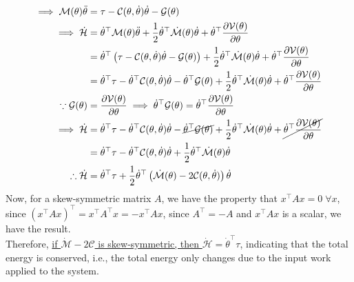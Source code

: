\begin{align*}
    \implies
    \mathcal{M}(\theta) \ddot{\theta}
     & =
    \tau
    -
    \mathcal{C}(\theta, \dot{\theta}) \dot{\theta}
    -
    \mathcal{G}(\theta)
    \\
    \implies
    \dot{\mathcal{H}}
     & =
    \dot{\theta}^{\top} \mathcal{M}(\theta) \ddot{\theta}
    +
    \frac{1}{2}
    \dot{\theta}^{\top} \dot{\mathcal{M}}(\theta) \dot{\theta}
    +
    \dot{\theta}^{\top} \frac{\partial \mathcal{V}(\theta)}{\partial \theta}
    \\
     & =
    \dot{\theta}^{\top} \left( \tau - \mathcal{C}(\theta, \dot{\theta}) \dot{\theta} - \mathcal{G}(\theta) \right)
    +
    \frac{1}{2}
    \dot{\theta}^{\top} \dot{\mathcal{M}}(\theta) \dot{\theta}
    +
    \dot{\theta}^{\top} \frac{\partial \mathcal{V}(\theta)}{\partial \theta}
    \\ & =
    \dot{\theta}^{\top} \tau
    -
    \dot{\theta}^{\top} \mathcal{C}(\theta, \dot{\theta}) \dot{\theta}
    -
    \dot{\theta}^{\top} \mathcal{G}(\theta)
    +
    \frac{1}{2}
    \dot{\theta}^{\top} \dot{\mathcal{M}}(\theta) \dot{\theta}
    +
    \dot{\theta}^{\top} \frac{\partial \mathcal{V}(\theta)}{\partial \theta}
    \\
    \because
    \mathcal{G}(\theta)
     & =
    \frac{\partial \mathcal{V}(\theta)}{\partial \theta}
    \implies
    \dot{\theta}^{\top} \mathcal{G}(\theta)
    =
    \dot{\theta}^{\top} \frac{\partial \mathcal{V}(\theta)}{\partial \theta}
    \\
    \implies
    \dot{\mathcal{H}}
     & =
    \dot{\theta}^{\top} \tau
    -
    \dot{\theta}^{\top} \mathcal{C}(\theta, \dot{\theta}) \dot{\theta}
    -
    \cancel{\dot{\theta}^{\top} \mathcal{G}(\theta)}
    +
    \frac{1}{2}
    \dot{\theta}^{\top} \dot{\mathcal{M}}(\theta) \dot{\theta}
    +
    \cancel{\dot{\theta}^{\top} \frac{\partial \mathcal{V}(\theta)}{\partial \theta}}
    \\ & =
    \dot{\theta}^{\top} \tau
    -
    \dot{\theta}^{\top} \mathcal{C}(\theta, \dot{\theta}) \dot{\theta}
    +
    \frac{1}{2}
    \dot{\theta}^{\top} \dot{\mathcal{M}}(\theta) \dot{\theta}
    \\
    \therefore
    \dot{\mathcal{H}}
     & =
    \dot{\theta}^{\top} \tau
    +
    \frac{1}{2}
    \dot{\theta}^{\top} \left(
    \dot{\mathcal{M}}(\theta)
    -
    2 \mathcal{C}(\theta, \dot{\theta})
    \right)
    \dot{\theta}
\end{align*}
Now, for a skew-symmetric matrix \( A \), we have the property that \( x^\top A x = 0 \; \forall x \), since \( {(x^\top A x)}^\top = x^\top A^\top x = -x^\top A x \), since \( A^\top = -A \) and \( x^\top A x \) is a scalar, we have the result. \\
Therefore, \underline{if \( \dot{\mathcal{M}}-2 \mathcal{C} \) is skew-symmetric, then \( \dot{\mathcal{H}} = \dot{\theta}^{\top} \tau \)}, indicating that the total energy is conserved, i.e., the total energy only changes due to the input work applied to the system.
